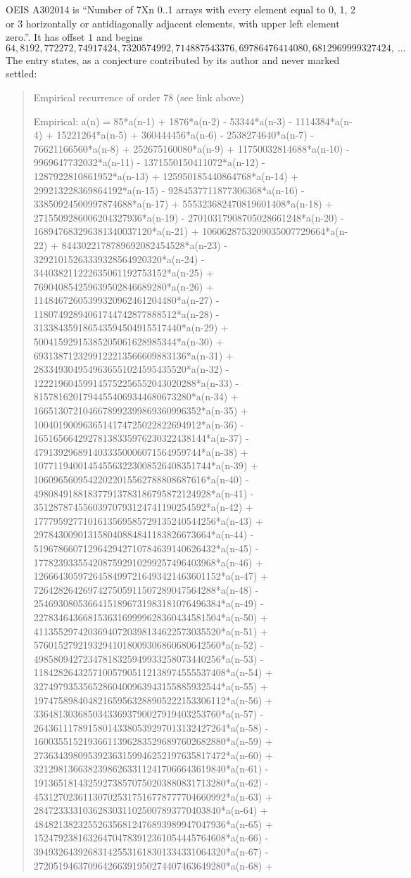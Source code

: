 \documentclass[11pt,a4paper]{article}
\theoremstyle{plain}
\theoremstyle{definition}
\begin{document}
OEIS A302014 is ``Number of 7Xn 0..1 arrays with every element equal to 0, 1, 2 or 3 horizontally or antidiagonally adjacent elements, with upper left element zero.''. It has offset $1$ and begins
\[
64, 8192, 772272, 74917424, 7320574992, 714887543376, 69786476414080, 6812969999327424,\ \dots
\]
The entry states, as a conjecture contributed by its author and never marked settled:
\begin{quote}\raggedright\small
Empirical recurrence of order 78 (see link above)

Empirical: a(n) = 85*a(n-1) + 1876*a(n-2) - 53344*a(n-3) - 1114384*a(n-4) + 15221264*a(n-5) + 360444456*a(n-6) - 2538274640*a(n-7) - 76621166560*a(n-8) + 252675160080*a(n-9) + 11750032814688*a(n-10) - 9969647732032*a(n-11) - 1371550150411072*a(n-12) - 1287922810861952*a(n-13) + 125950185440864768*a(n-14) + 299213228369864192*a(n-15) - 9284537711877306368*a(n-16) - 33850924500997874688*a(n-17) + 555323682470819601408*a(n-18) + 2715509286006204327936*a(n-19) - 27010317908705028661248*a(n-20) - 168947683296381340037120*a(n-21) + 1060628753209035007729664*a(n-22) + 8443022178789692082454528*a(n-23) - 32921015263339328564920320*a(n-24) - 344038211222635061192753152*a(n-25) + 769040854259639502846689280*a(n-26) + 11484672605399320962461204480*a(n-27) - 11807492894061744742877888512*a(n-28) - 313384359186543594504915517440*a(n-29) + 50041592915385205061628985344*a(n-30) + 6931387123299122213566609883136*a(n-31) + 2833493049549636551024595435520*a(n-32) - 122219604599145752256552043020288*a(n-33) - 81578162017944554069344680673280*a(n-34) + 1665130721046678992399869360996352*a(n-35) + 1004019009636514174725022822694912*a(n-36) - 16516566429278138335976230322438144*a(n-37) - 4791392968914033350006071564959744*a(n-38) + 107711940014545563223008526408351744*a(n-39) + 10609656095422022015562788808687616*a(n-40) - 498084918818377913783186795872124928*a(n-41) - 35128787455603970793124741190254592*a(n-42) + 1777959277101613569585729135240544256*a(n-43) + 297843009013158040884841183826673664*a(n-44) - 5196786607129642942710784639140626432*a(n-45) - 1778239335542087592910299257496403968*a(n-46) + 12666430597264584997216493421463601152*a(n-47) + 7264282642697427505911507289047564288*a(n-48) - 25469308053664151896731983181076496384*a(n-49) - 22783464366815363169999628360434581504*a(n-50) + 41135529742036940720398134622573035520*a(n-51) + 57601527921932941018009306860680642560*a(n-52) - 49858094272347818325949933258073440256*a(n-53) - 118428264325710057905112138974555537408*a(n-54) + 32749793535652860400963943155885932544*a(n-55) + 197475898404821659563288905222153306112*a(n-56) + 33648130368503433693790027919403253760*a(n-57) - 264361117891580143380539297013132427264*a(n-58) - 160035515219366113962835296897602682880*a(n-59) + 273634398095392363159946252197635817472*a(n-60) + 321298136638239862633112417066643619840*a(n-61) - 191365181432592738570750203880831713280*a(n-62) - 453127023611307025317516778777704660992*a(n-63) + 28472333310362830311025007893770403840*a(n-64) + 484821382325526356812476893989947047936*a(n-65) + 152479238163264704783912361054445764608*a(n-66) - 394932643926831425531618301334331064320*a(n-67) - 272051946370964266391950274407463649280*a(n-68) + 
\end{quote}
\end{document}
